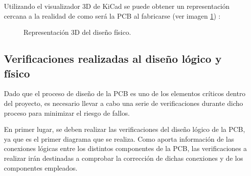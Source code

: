 Utilizando el visualizador 3D de KiCad se puede obtener un representación cercana a la realidad de como será la \ac{PCB} al fabricarse (ver imagen \ref{fig:Simulacion_3D}) :

\begin{figure}[htbp]
    \centering
    \hfill
    \caption{Representación 3D del diseño físico.} 
    \label{fig:Simulacion_3D}
\end{figure}
    
\subsection{Verificaciones realizadas al diseño lógico y físico}

Dado que el proceso de diseño de la \ac{PCB} es uno de los elementos críticos dentro del proyecto, es necesario llevar a cabo una serie de verificaciones durante dicho proceso para minimizar el riesgo de fallos.

En primer lugar, se deben realizar las verificaciones del diseño lógico de la \ac{PCB}, ya que es el primer diagrama que se realiza. Como aporta información de las conexiones lógicas entre los distintos componentes de la \ac{PCB}, las verificaciones a realizar irán destinadas a comprobar la corrección de dichas conexiones y de los componentes empleados.

